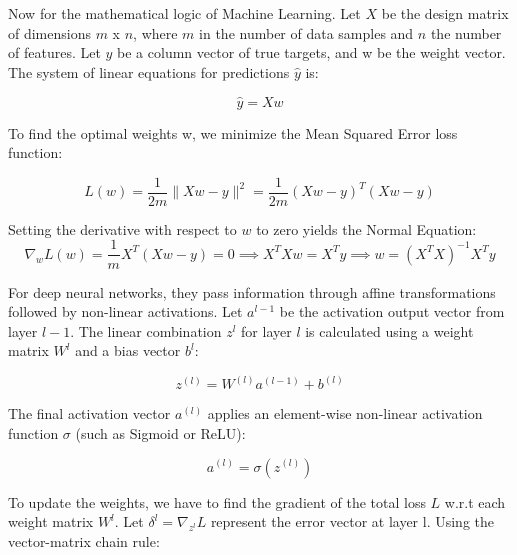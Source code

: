 \documentclass[12pt]{article}
\begin{document}
Now for the mathematical logic of Machine Learning. Let $X$ be the design matrix of dimensions $m$ x $n$, where $m$ in the number of data samples and $n$ the number of features. Let $y$ be a column vector of true targets, and w be the weight vector. The system of linear equations for predictions $\hat{y}$ is:

\begin{equation}
\hat{y}=Xw \tag{19}
\end{equation}
\vspace{0.1cm}

To find the optimal weights w, we minimize the Mean Squared Error loss function:

\begin{equation}
    L(w)=\frac{1}{2m}\|Xw-y\|^{2}=\frac{1}{2m}(Xw-y)^{T}(Xw-y) \tag{20}
\end{equation}
\vspace{0.1cm}

Setting the derivative with respect to $w$ to zero yields the Normal Equation: 
\begin{equation}
\nabla_w L(w) = \frac{1}{m} X^T(Xw - y) = 0 \implies X^TXw = X^Ty \implies w = (X^TX)^{-1}X^Ty \tag{21}
\end{equation}
\vspace{0.1cm}

For deep neural networks, they pass information through affine transformations followed by non-linear activations. Let $a^{l-1}$ be the activation output vector from layer $l-1$. The linear combination $z^{l}$ for layer $l$ is calculated using a weight matrix $W^{l}$ and a bias vector $b^l$:

\begin{equation}
    z^{(l)}=W^{(l)}a^{(l-1)}+b^{(l)} \tag{22}
\end{equation}
\vspace{0.1cm}

The final activation vector $a^{(l)}$ applies an element-wise non-linear activation function $\sigma$ (such as Sigmoid or ReLU):

\begin{equation}
a^{(l)}=\sigma \left(z^{(l)}\right) \tag{23}
\end{equation}
\vspace{0.1cm}

To update the weights, we have to find the gradient of the total loss $L$ w.r.t each weight matrix $W^l$. Let $\delta^{l} = \nabla_{z^{l}} L$ represent the error vector at layer l. Using the vector-matrix chain rule: 
\end{document}
